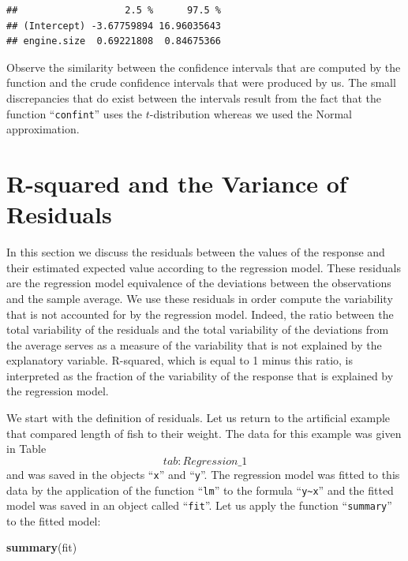 \documentclass[]{krantz}
\makeatletter
\newenvironment{Shaded}{\begin{snugshade}}{\end{snugshade}}
\newcommand{\KeywordTok}[1]{\textcolor[rgb]{0.13,0.29,0.53}{\textbf{#1}}}
\newcommand{\NormalTok}[1]{#1}
\newenvironment{kframe}{%
\medskip{}
\setlength{\fboxsep}{.8em}
 \def\at@end@of@kframe{}%
 \ifinner\ifhmode%
  \def\at@end@of@kframe{\end{minipage}}%
  \begin{minipage}{\columnwidth}%
 \fi\fi%
 \def\FrameCommand##1{\hskip\@totalleftmargin \hskip-\fboxsep
 \colorbox{shadecolor}{##1}\hskip-\fboxsep
     \hskip-\linewidth \hskip-\@totalleftmargin \hskip\columnwidth}%
 \MakeFramed {\advance\hsize-\width
   \@totalleftmargin\z@ \linewidth\hsize
   \@setminipage}}%
 {\par\unskip\endMakeFramed%
 \at@end@of@kframe}
\renewenvironment{Shaded}{\begin{kframe}}{\end{kframe}}
\theoremstyle{definition}
\theoremstyle{definition}
\theoremstyle{definition}
\theoremstyle{remark}
\makeatother
\begin{document}
\begin{verbatim}
##                   2.5 %      97.5 %
## (Intercept) -3.67759894 16.96035643
## engine.size  0.69221808  0.84675366
\end{verbatim}

Observe the similarity between the confidence intervals that are
computed by the function and the crude confidence intervals that were
produced by us. The small discrepancies that do exist between the
intervals result from the fact that the function ``\texttt{confint}'' uses the
\(t\)-distribution whereas we used the Normal approximation.

\hypertarget{r-squared-and-the-variance-of-residuals}{%
\section{R-squared and the Variance of Residuals}\label{r-squared-and-the-variance-of-residuals}}

In this section we discuss the residuals between the values of the
response and their estimated expected value according to the regression
model. These residuals are the regression model equivalence of the
deviations between the observations and the sample average. We use these
residuals in order compute the variability that is not accounted for by
the regression model. Indeed, the ratio between the total variability of
the residuals and the total variability of the deviations from the
average serves as a measure of the variability that is not explained by
the explanatory variable. R-squared, which is equal to 1 minus this
ratio, is interpreted as the fraction of the variability of the response
that is explained by the regression model.

We start with the definition of residuals. Let us return to the
artificial example that compared length of fish to their weight. The
data for this example was given in Table~\[tab:Regression\_1\] and was
saved in the objects ``\texttt{x}'' and ``\texttt{y}''. The regression model was fitted to
this data by the application of the function ``\texttt{lm}'' to the formula
``\texttt{y\textasciitilde{}x}'' and the fitted model was saved in an object called ``\texttt{fit}''. Let
us apply the function ``\texttt{summary}'' to the fitted model:

\begin{Shaded}
\begin{Highlighting}[]
\KeywordTok{summary}\NormalTok{(fit)}
\end{Highlighting}
\end{Shaded}
\end{document}
